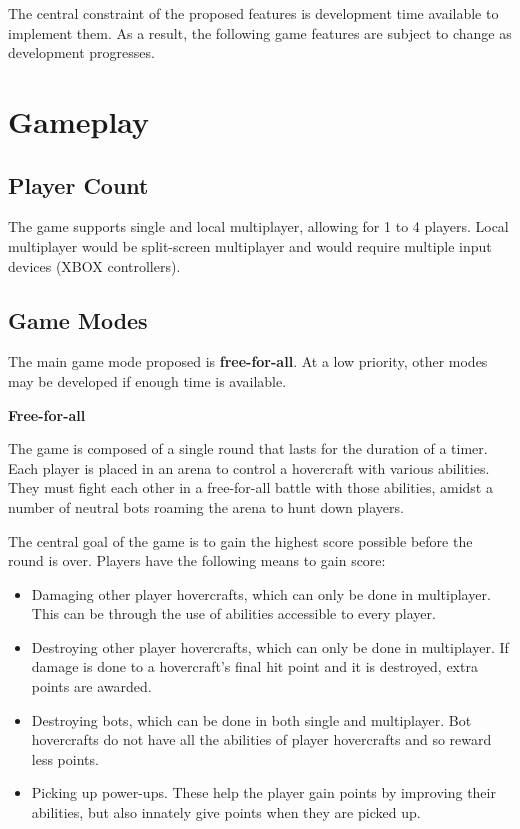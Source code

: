 \documentclass{article}
\theoremstyle{definition}
\begin{document}
The central constraint of the proposed features is development time available
to implement them. As a result, the following game features are subject to
change as development progresses.

\section{Gameplay}

\subsection{Player Count}

The game supports single and local multiplayer, allowing for 1 to 4 players.
Local multiplayer would be split-screen multiplayer and would require multiple
input devices (XBOX controllers).

\subsection{Game Modes}

The main game mode proposed is \textbf{free-for-all}. At a low priority, other
modes may be developed if enough time is available.

\textbf{Free-for-all}

The game is composed of a single round that lasts for the duration of a timer.
Each player is placed in an arena to control a hovercraft with various
abilities. They must fight each other in a free-for-all battle with those
abilities, amidst a number of neutral bots roaming the arena to hunt down
players.

The central goal of the game is to gain the highest score possible before the
round is over. Players have the following means to gain score:
\begin{itemize}
  \item Damaging other player hovercrafts, which can only be done in
    multiplayer. This can be through the use of abilities accessible to every
    player.
  \item Destroying other player hovercrafts, which can only be done in
    multiplayer. If damage is done to a hovercraft's final hit point and it is
    destroyed, extra points are awarded.
  \item Destroying bots, which can be done in both single and multiplayer.
    Bot hovercrafts do not have all the abilities of player hovercrafts and
    so reward less points.
  \item Picking up power-ups. These help the player gain points by improving
    their abilities, but also innately give points when they are picked up.
\end{itemize}
\end{document}
